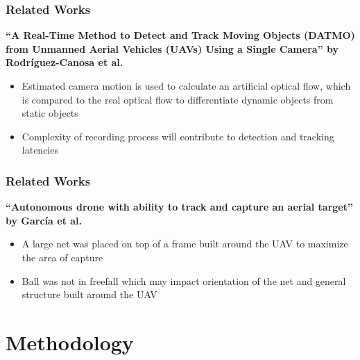 \documentclass{beamer}
\begin{document}

\begin{frame}
\frametitle{Related Works}
\textbf{“A Real-Time Method to Detect and Track Moving Objects (DATMO) from Unmanned Aerial Vehicles (UAVs) Using a Single Camera” by Rodríguez-Canosa et al.} 
\begin{itemize}
    \item Estimated camera motion is used to calculate an artificial optical flow, which is compared to the real optical flow to differentiate dynamic objects from static objects
    \item Complexity of recording process will contribute to detection and tracking latencies
\end{itemize}
\end{frame}


\begin{frame}
\frametitle{Related Works}
\textbf{“Autonomous drone with ability to track and capture an aerial target” by García et al.} 
\begin{itemize}
    \item A large net was placed on top of a frame built around the UAV to maximize the area of capture 
    \item Ball was not in freefall which may impact orientation of the net and general structure built around the UAV
\end{itemize}
\end{frame}


\section{Methodology}
\end{document}
